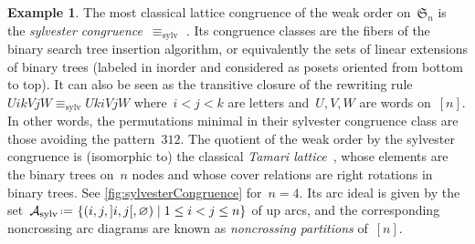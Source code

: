 \documentclass{amsart}
\theoremstyle{definition}
\newtheorem{example}[theorem]{Example}
\newcommand{\f}[1]{{\mathfrak{#1}}} %
\newcommand{\set}[2]{\left\{ #1 \;\middle|\; #2 \right\}} %
\newcommand{\eqdef}{\mbox{\,\raisebox{0.2ex}{\scriptsize\ensuremath{\mathrm:}}\ensuremath{=}\,}} %
\newcommand{\darkblue}{\color{darkblue}} %
\newcommand{\defn}[1]{\textsl{\darkblue #1}} %
\newcommand{\arcs}{{\mathcal{A}}} %
\begin{document}
\begin{example}
\label{exm:sylvesterCongruence}
The most classical lattice congruence of the weak order on~$\f{S}_n$ is the \defn{sylvester congruence}~$\equiv_\textrm{sylv}$ \cite{LodayRonco, HivertNovelliThibon-algebraBinarySearchTrees}.
Its congruence classes are the fibers of the binary search tree insertion algorithm, or equivalently the sets of linear extensions of binary trees (labeled in inorder and considered as posets oriented from bottom to top).
It can also be seen as the transitive closure of the rewriting rule~$U i k V j W \equiv_\textrm{sylv} U k i V j W$ where~$i < j < k$ are letters and~$U,V,W$ are words on~$[n]$.
In other words, the permutations minimal in their sylvester congruence class are those avoiding the pattern~$312$.
The quotient of the weak order by the sylvester congruence is (isomorphic to) the classical \defn{Tamari lattice}~\cite{Tamari}, whose elements are the binary trees on~$n$ nodes and whose cover relations are right rotations in binary trees.
See \cref{fig:sylvesterCongruence} for~$n = 4$.
Its arc ideal is given by the set~$\arcs_\textrm{sylv} \eqdef \set{(i, j, {]i,j[}, \varnothing)}{1 \le i < j \le n}$ of up arcs, and the corresponding noncrossing arc diagrams are known as \defn{noncrossing partitions} of~$[n]$.
%
\begin{figure}
	\capstart

\end{figure}
\end{example}
\end{document}
